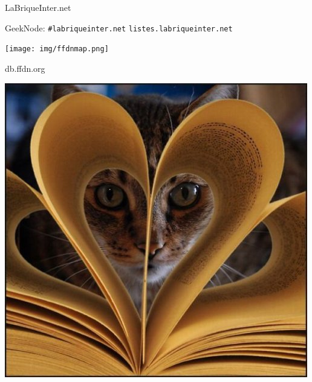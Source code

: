 \documentclass[notes=hide]{beamer}
\begin{document}
\begin{frame}[t,plain]
\huge
\begin{center}
\vspace{\fill}
{\color{red}LaBrique}Inter.net

{\large GeekNode: \texttt{\#labriqueinter.net}}  {\large \texttt{listes.labriqueinter.net}}

\vspace{.4cm}
\texttt{[image: img/ffdnmap.png]}

\vspace{\fill}
db.{\color{ffdncolor}ffdn.org}
\vspace{\fill}
\end{center}
\end{frame}

\begin{frame}[t,plain]
\begin{center}
  \vspace{\fill}
  \includegraphics[width=\textwidth]{img/cat-love.jpg}
  \vspace{\fill}
\end{center}
\end{frame}
\end{document}
